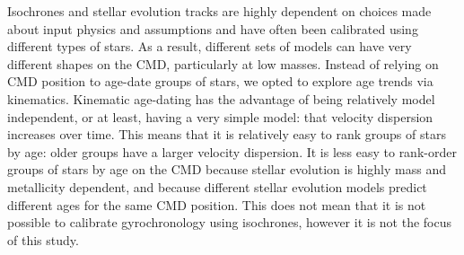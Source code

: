 Isochrones and stellar evolution tracks are highly dependent on choices made
about input physics and assumptions and have often been calibrated using
different types of stars.
As a result, different sets of models can have very different shapes on the
CMD, particularly at low masses.
Instead of relying on CMD position to age-date groups of stars, we opted to
explore age trends via kinematics.
Kinematic age-dating has the advantage of being relatively model independent,
or at least, having a very simple model: that velocity dispersion increases
over time.
This means that it is relatively easy to rank groups of stars by age: older
groups have a larger velocity dispersion.
It is less easy to rank-order groups of stars by age on the CMD because
stellar evolution is highly mass and metallicity dependent, and because
different stellar evolution models predict different ages for the same CMD
position.
This does not mean that it is not possible to calibrate gyrochronology using
isochrones, however it is not the focus of this study.
